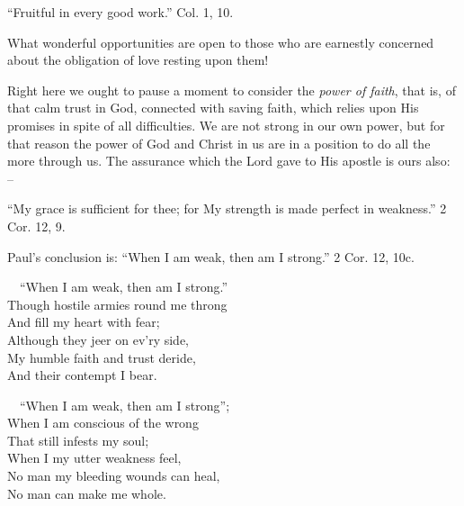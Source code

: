 \documentclass[
]{book}
\begin{document}
``Fruitful in every good work.'' Col. 1, 10.

What wonderful opportunities are open to those who are earnestly concerned about the obligation of love resting upon them!

Right here we ought to pause a moment to consider the \emph{power of faith}, that is, of that calm trust in God, connected with saving faith, which relies upon His promises in spite of all difficulties. We are not strong in our own power, but for that reason the power of God and Christ in us are in a position to do all the more through us. The assurance which the Lord gave to His apostle is ours also: --

``My grace is sufficient for thee; for My strength is made perfect in weakness.'' 2 Cor. 12, 9.

Paul's conclusion is: ``When I am weak, then am I strong.'' 2 Cor. 12, 10c.

~~``When I am weak, then am I strong.''\\
\hspace*{0.333em}\hspace*{0.333em}Though hostile armies round me throng\\
\hspace*{0.333em}\hspace*{0.333em}And fill my heart with fear;\\
\hspace*{0.333em}\hspace*{0.333em}Although they jeer on ev'ry side,\\
\hspace*{0.333em}\hspace*{0.333em}My humble faith and trust deride,\\
\hspace*{0.333em}\hspace*{0.333em}And their contempt I bear.

~~``When I am weak, then am I strong'';\\
\hspace*{0.333em}\hspace*{0.333em}When I am conscious of the wrong\\
\hspace*{0.333em}\hspace*{0.333em}That still infests my soul;\\
\hspace*{0.333em}\hspace*{0.333em}When I my utter weakness feel,\\
\hspace*{0.333em}\hspace*{0.333em}No man my bleeding wounds can heal,\\
\hspace*{0.333em}\hspace*{0.333em}No man can make me whole.
\end{document}
